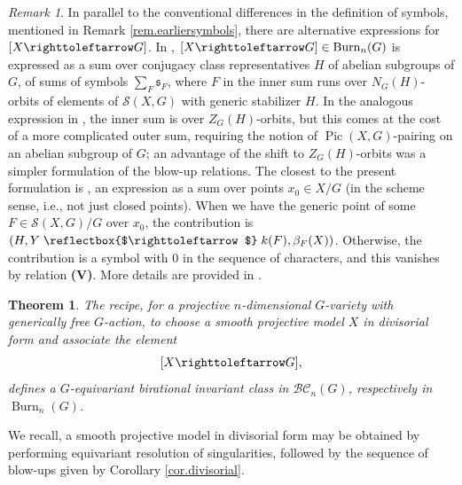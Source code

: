 \documentclass[12pt,reqno]{amsart}
\theoremstyle{plain}
\newtheorem{theo}[prop]{Theorem}
\theoremstyle{remark}
\newtheorem{rema}[prop]{Remark}
\theoremstyle{definition}
\numberwithin{equation}{section}
\newcommand{\BC}{{\mathcal B}{\mathcal C}}
\newcommand{\actsfromleft}{\mathrel{\reflectbox{$\righttoleftarrow$}}}
\newcommand{\actsfromright}{\righttoleftarrow}
\DeclareMathOperator{\Pic}{Pic}
\DeclareMathOperator{\Burn}{Burn}
\begin{document}
\begin{rema}
\label{rem.classofaction}
In parallel to the conventional differences in the definition of symbols, mentioned in Remark \ref{rem.earliersymbols}, there are alternative expressions for $[X\actsfromright G]$.
In \cite{BnG}, $[X\actsfromright G]\in \Burn_n(G)$ is expressed as a sum over conjugacy class representatives $H$ of abelian subgroups of $G$, of sums of symbols $\sum_F \mathfrak{s}_F$, where $F$ in the inner sum runs over $N_G(H)$-orbits of elements of $\mathcal{S}(X,G)$ with generic stabilizer $H$.
In the analogous expression in \cite{KT-vector}, the inner sum is over $Z_G(H)$-orbits, but this comes at the cost of a more complicated outer sum, requiring the notion of $\Pic(X,G)$-pairing on an abelian subgroup of $G$; an advantage of the shift to $Z_G(H)$-orbits was a simpler formulation of the blow-up relations.
The closest to the present formulation is \cite[p.~3027]{KT-toric}, an expression as a sum over points $x_0\in X/G$ (in the scheme sense, i.e., not just closed points).
When we have the generic point of some $F\in \mathcal{S}(X,G)/G$ over $x_0$, the contribution is $(H,Y\actsfromleft k(F),\beta_F(X))$.
Otherwise, the contribution is a symbol with $0$ in the sequence of characters, and this vanishes by relation \textbf{(V)}.
More details are provided in \cite[Sect.\ 2]{KT-struct}.
\end{rema}

\begin{theo}
\label{thm.biratinvarclass}
The recipe, for a projective $n$-dimensional $G$-variety with generically free $G$-action, to choose a smooth projective model $X$ in divisorial form and 
associate the element
\[ [X\actsfromright G], \]
defines a $G$-equivariant birational invariant class in $\BC_n(G)$, respectively in $\Burn_n(G)$.
\end{theo}

We recall, a smooth projective model in divisorial form may be obtained by performing equivariant resolution of singularities, followed by the sequence of blow-ups given by Corollary \ref{cor.divisorial}.
\end{document}
